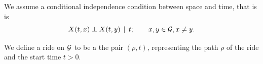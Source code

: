 \documentclass[12pt]{article}
\begin{document}
{{We assume a conditional independence condition between space and time, that is is 
\[X(t, x) \perp X(t, y) \;{\,|\,}\; t; \qquad x,y \in \mathcal{G}, x\neq y.\] 

We define a ride on $\mathcal{G}$ to be a the pair $(\rho, t)$, representing the path $\rho$ of the ride and the start time $t>0$.






}}
\end{document}
